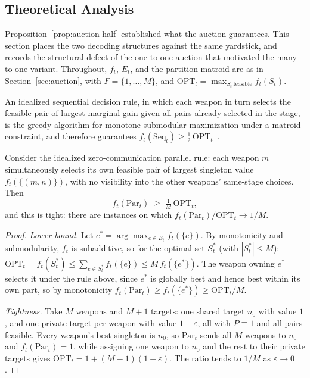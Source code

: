 \subsection{Theoretical Analysis}
\label{sec:submodular}

Proposition~\ref{prop:auction-half} established what the auction guarantees. This section places the two decoding structures against the same yardstick, and records the structural defect of the one-to-one auction that motivated the many-to-one variant. Throughout, $f_t$, $E_t$, and the partition matroid are as in Section~\ref{sec:auction}, with $F = \{1,\ldots,M\}$, and $\text{OPT}_t = \max_{S_t\ \text{feasible}} f_t(S_t)$.

\begin{proposition}
\label{prop:seq-half}
An idealized sequential decision rule, in which each weapon in turn selects the feasible pair of largest marginal gain given all pairs already selected in the stage, is the greedy algorithm for monotone submodular maximization under a matroid constraint, and therefore guarantees $f_t(\mathrm{Seq}_t) \geq \tfrac12\,\text{OPT}_t$~\cite{fisher1978analysis}.
\end{proposition}

\begin{proposition}
\label{prop:par-linear}
Consider the idealized zero-communication parallel rule: each weapon $m$ simultaneously selects its own feasible pair of largest singleton value $f_t(\{(m,n)\})$, with no visibility into the other weapons' same-stage choices. Then
\begin{equation}
f_t(\mathrm{Par}_t) \;\geq\; \tfrac{1}{M}\,\text{OPT}_t,
\end{equation}
and this is tight: there are instances on which $f_t(\mathrm{Par}_t)/\text{OPT}_t \to 1/M$.
\end{proposition}
\begin{proof}
\emph{Lower bound.} Let $e^* = \arg\max_{e \in E_t} f_t(\{e\})$. By monotonicity and submodularity, $f_t$ is subadditive, so for the optimal set $S^*_t$ (with $|S^*_t|\leq M$): $\text{OPT}_t = f_t(S^*_t) \leq \sum_{e\in S^*_t} f_t(\{e\}) \leq M\, f_t(\{e^*\})$. The weapon owning $e^*$ selects it under the rule above, since $e^*$ is globally best and hence best within its own part, so by monotonicity $f_t(\mathrm{Par}_t) \geq f_t(\{e^*\}) \geq \text{OPT}_t / M$.

\emph{Tightness.} Take $M$ weapons and $M{+}1$ targets: one shared target $n_0$ with value $1$, and one private target per weapon with value $1-\varepsilon$, all with $P \equiv 1$ and all pairs feasible. Every weapon's best singleton is $n_0$, so $\mathrm{Par}_t$ sends all $M$ weapons to $n_0$ and $f_t(\mathrm{Par}_t)=1$, while assigning one weapon to $n_0$ and the rest to their private targets gives $\text{OPT}_t = 1 + (M{-}1)(1{-}\varepsilon)$. The ratio tends to $1/M$ as $\varepsilon \to 0$.
\end{proof}

